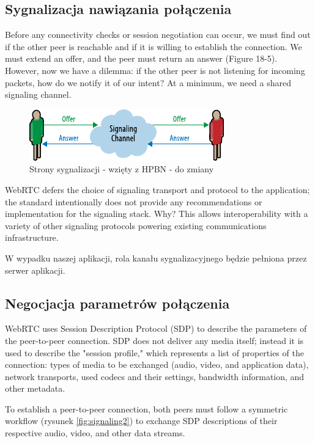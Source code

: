\subsection{Sygnalizacja nawiązania połączenia}

Before any connectivity checks or session negotiation can occur, we must find out if the other peer
is reachable and if it is willing to establish the connection. We must extend an offer, and the peer
must return an answer (Figure 18-5). However, now we have a dilemma: if the other peer is not
listening for incoming packets, how do we notify it of our intent? At a minimum, we need a shared
signaling channel.

\begin{figure}[H]
    \centering
    \includegraphics{img/signaling-1}
    \caption{Strony sygnalizacji - wzięty z HPBN - do zmiany}
    \label{fig:signaling}
\end{figure}

WebRTC defers the choice of signaling transport and protocol to the application; the standard
intentionally does not provide any recommendations or implementation for the signaling stack. Why?
This allows interoperability with a variety of other signaling protocols powering existing
communications infrastructure.

W wypadku naszej aplikacji, rola kanału sygnalizacyjnego będzie pełniona przez serwer aplikacji.

\subsection{Negocjacja parametrów połączenia}
\label{negotiation}

WebRTC uses Session Description Protocol (SDP) to describe the parameters of the peer-to-peer
connection. SDP does not deliver any media itself; instead it is used to describe the "session
profile," which represents a list of properties of the connection: types of media to be exchanged
(audio, video, and application data), network transports, used codecs and their settings, bandwidth
information, and other metadata.

To establish a peer-to-peer connection, both peers must follow a symmetric workflow (rysunek
\ref{fig:signaling2}) to exchange SDP descriptions of their respective audio, video, and other data
streams.

